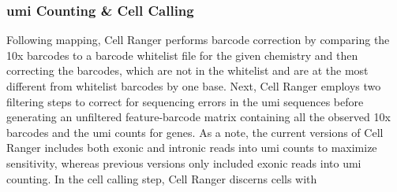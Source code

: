 \subsubsection{\gls{umi} Counting \& Cell Calling}

Following mapping, Cell Ranger performs barcode correction by comparing the 10x barcodes to a barcode whitelist file for the given chemistry and then correcting the barcodes, which are not in the whitelist and are at the most different from whitelist barcodes by one base. Next, Cell Ranger employs two filtering steps to correct for sequencing errors in the \gls{umi} sequences before generating an unfiltered feature-barcode matrix containing all the observed 10x barcodes and the \gls{umi} counts for genes. As a note, the current versions of Cell Ranger includes both exonic and intronic reads into \gls{umi} counts to maximize sensitivity, whereas previous versions only included exonic reads into \gls{umi} counting. In the cell calling step, Cell Ranger discerns cells with 

